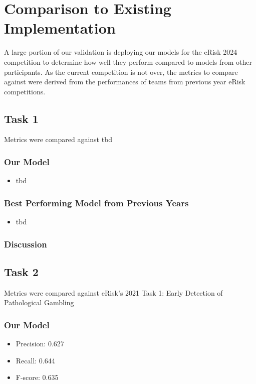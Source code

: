\documentclass[12pt, titlepage]{article}
\begin{document}
	
\section{Comparison to Existing Implementation}	

A large portion of our validation is deploying our models for the eRisk 2024 competition to determine how well they perform compared to models from other participants. As the current competition is not over, the metrics to compare against were derived from the performances of teams from previous year eRisk competitions.

\subsection{Task 1}
Metrics were compared against tbd

\subsubsection{Our Model}
\begin{itemize}
\item tbd
\end{itemize}

\subsubsection{Best Performing Model from Previous Years}
\begin{itemize}
\item tbd
\end{itemize}

\subsubsection{Discussion}


\subsection{Task 2}
Metrics were compared against eRisk's 2021 Task 1: Early Detection of Pathological Gambling

\subsubsection{Our Model}
\begin{itemize}
    \item Precision: 0.627
    \item Recall: 0.644
    \item F-score: 0.635
\end{itemize}
\end{document}
